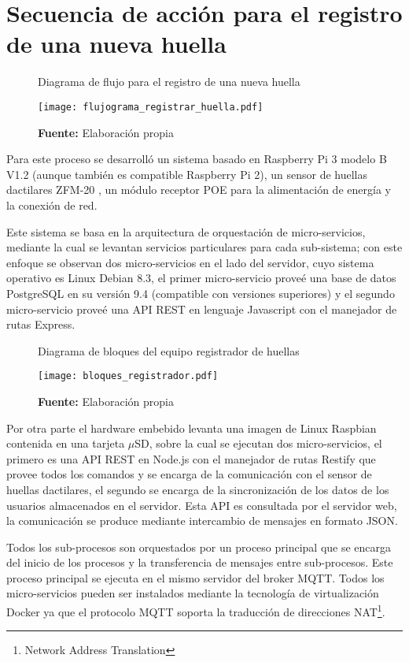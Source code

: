 \documentclass[../principal]{subfiles}
\begin{document}
  \section{Secuencia de acción para el registro de una nueva huella} \label{sec:registro_nueva_huella}

  \begin{figure}[h]
    \centering
    \caption{Diagrama de flujo para el registro de una nueva huella}
    \texttt{[image: flujograma\_registrar\_huella.pdf]}
    \caption*{\textbf{Fuente:} Elaboración propia}
    \label{fig:flujo_registrador}
  \end{figure}

  Para este proceso se desarrolló un sistema basado en Raspberry Pi 3 modelo B V1.2 (aunque también es compatible Raspberry Pi 2), un sensor de huellas dactilares ZFM-20 \cite{manual:fingerprint_ZFM-20}, un módulo receptor POE para la alimentación de energía y la conexión de red.

  Este sistema se basa en la arquitectura de orquestación de micro-servicios, mediante la cual se levantan servicios particulares para cada sub-sistema; con este enfoque se observan dos micro-servicios en el lado del servidor, cuyo sistema operativo es Linux Debian 8.3, el primer micro-servicio proveé una base de datos PostgreSQL en su versión 9.4 (compatible con versiones superiores) y el segundo micro-servicio proveé una API REST en lenguaje Javascript con el manejador de rutas Express.

  \begin{figure}[h]
    \centering
    \caption{Diagrama de bloques del equipo registrador de huellas}
    \texttt{[image: bloques\_registrador.pdf]}
    \caption*{\textbf{Fuente:} Elaboración propia}
  \end{figure}

  Por otra parte el hardware embebido levanta una imagen de Linux Raspbian contenida en una tarjeta $ \mu $SD, sobre la cual se ejecutan dos micro-servicios, el primero es una API REST en Node.js con el manejador de rutas Restify que provee todos los comandos y se encarga de la comunicación con el sensor de huellas dactilares, el segundo se encarga de la sincronización de los datos de los usuarios almacenados en el servidor. Esta API es consultada por el servidor web, la comunicación se produce mediante intercambio de mensajes en formato JSON.
  
  Todos los sub-procesos son orquestados por un proceso principal que se encarga del inicio de los procesos y la transferencia de mensajes entre sub-procesos. Este proceso principal se ejecuta en el mismo servidor del broker MQTT. Todos los micro-servicios pueden ser instalados mediante la tecnología de virtualización Docker ya que el protocolo MQTT soporta la traducción de direcciones NAT\footnote{Network Address Translation}.
\end{document}
